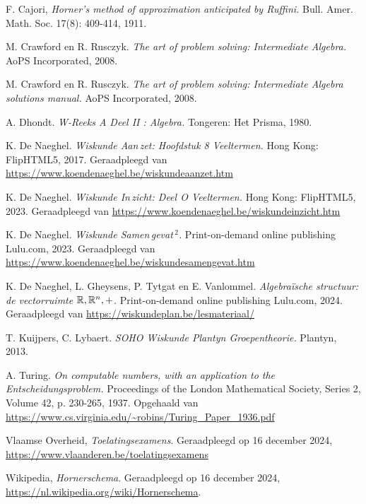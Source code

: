 \documentclass{ximera}
\begin{document}
\blancobijrectoverso

\begin{thebibliography}{99}

F. Cajori, {\em Horner's method of approximation anticipated by Ruffini.} Bull. Amer. Math. Soc. 17(8): 409-414, 1911.

M. Crawford en R. Rusczyk. {\em The art of problem solving: Intermediate Algebra.} AoPS Incorporated, 2008.

M. Crawford en R. Rusczyk. {\em The art of problem solving: Intermediate Algebra solutions manual.} AoPS Incorporated, 2008.

A. Dhondt. {\em W-Reeks A Deel II : Algebra.} Tongeren: Het Prisma, 1980.

K. De Naeghel. {\em Wiskunde Aan\,zet: Hoofdstuk 8 Veeltermen.} Hong Kong: FlipHTML5, 2017. Geraadpleegd van \url{https://www.koendenaeghel.be/wiskundeaanzet.htm}

K. De Naeghel. {\em Wiskunde In\,zicht: Deel O Veeltermen.} Hong Kong: FlipHTML5, 2023. Geraadpleegd van \url{https://www.koendenaeghel.be/wiskundeinzicht.htm}

K. De Naeghel. {\em Wiskunde Samen\,gevat\,${}^{2}$.} Print-on-demand online publishing Lulu.com, 2023. Geraadpleegd van \url{https://www.koendenaeghel.be/wiskundesamengevat.htm} 

K. De Naeghel, L. Gheysens, P. Tytgat en E. Vanlommel. {\em Algebra\"ische structuur: de vectorruimte $\mathbb{R},\mathbb{R}^n,+$.} Print-on-demand online publishing Lulu.com, 2024. Geraadpleegd van \url{https://wiskundeplan.be/lesmateriaal/}

T. Kuijpers, C. Lybaert. {\em SOHO Wiskunde Plantyn Groepentheorie.} Plantyn, 2013.

A. Turing. {\em On computable numbers, with an application to the Entscheidungsproblem.} Proceedings of the London Mathematical Society, Series 2, Volume 42, p. 230-265, 1937. 
Opgehaald van \url{https://www.cs.virginia.edu/~robins/Turing_Paper_1936.pdf}

Vlaamse Overheid, {\em Toelatingsexamens}. Geraadpleegd op 16 december 2024, \url{https://www.vlaanderen.be/toelatingsexamens}

Wikipedia, {\em Hornerschema}. Geraadpleegd op 16 december 2024, \url{https://nl.wikipedia.org/wiki/Hornerschema}.

\end{thebibliography}
\end{document}

